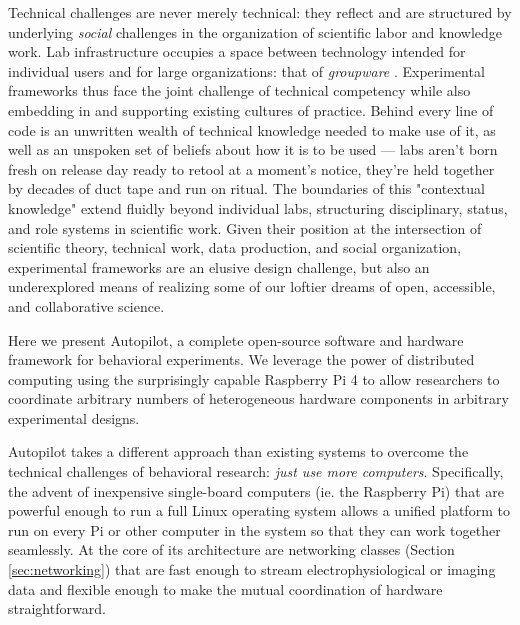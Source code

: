 Technical challenges are never merely technical: they reflect and are structured by underlying \textit{social} challenges in the organization of scientific labor and knowledge work. Lab infrastructure occupies a space between technology intended for individual users and for large organizations: that of \textit{groupware} \citep{johnson-lenzGroupwareCoiningDefining1998,johnson-lenzPostmechanisticGroupwarePrimitives1991}. Experimental frameworks thus face the joint challenge of technical competency while also embedding in and supporting existing cultures of practice. Behind every line of code is an unwritten wealth of technical knowledge needed to make use of it, as well as an unspoken set of beliefs about how it is to be used --- labs aren't born fresh on release day ready to retool at a moment's notice, they're held together by decades of duct tape and run on ritual. The boundaries of this "contextual knowledge" extend fluidly beyond individual labs, structuring disciplinary, status, and role systems in scientific work\citep{barleyBackroomsScienceWork1994}. Given their position at the intersection of scientific theory, technical work, data production, and social organization, experimental frameworks are an elusive design challenge, but also an underexplored means of realizing some of our loftier dreams of open, accessible, and collaborative science. 

\clearpage

Here we present Autopilot, a complete open-source software and hardware framework for behavioral experiments. We leverage the power of distributed computing using the surprisingly capable Raspberry Pi 4 to allow researchers to coordinate arbitrary numbers of heterogeneous hardware components in arbitrary experimental designs.

Autopilot takes a different approach than existing systems to overcome the technical challenges of behavioral research: \textit{just use more computers}. Specifically, the advent of inexpensive single-board computers (ie. the Raspberry Pi) that are powerful enough to run a full Linux operating system allows a unified platform to run on every Pi or other computer in the system so that they can work together seamlessly. At the core of its architecture are networking classes (Section \ref{sec:networking}) that are fast enough to stream electrophysiological or imaging data and flexible enough to make the mutual coordination of hardware straightforward. 

